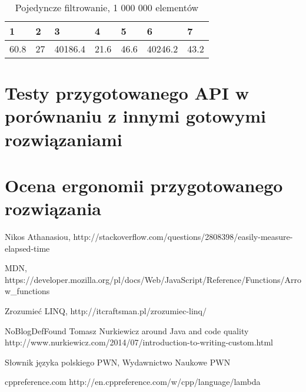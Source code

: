 \documentclass[a4paper,10pt]{report}
\begin{document}
\begin{table}[t]
	\caption{Pojedyncze filtrowanie, 1 000 000 elementów}
	\label{tab2}
	\begin{tabular}{|l|l|l|l|l|l|l|}
		\hline 
		1 & 2 & 3 & 4 & 5 & 6 & 7\\
		\hline
		60.8 & 27 & 40186.4 & 21.6 & 46.6 & 40246.2 & 43.2\\
		\hline
	\end{tabular} 
\end{table}

\section{Testy przygotowanego API w porównaniu z innymi gotowymi rozwiązaniami}
\section{Ocena ergonomii przygotowanego rozwiązania}
\begin{thebibliography}{9}
	
	Nikos Athanasiou,
	http://stackoverflow.com/questions/2808398/easily-measure-elapsed-time
	
	MDN,
	https://developer.mozilla.org/pl/docs/Web/JavaScript/Reference/Functions/Arrow\_functions
	
	Zrozumieć LINQ,
	http://itcraftsman.pl/zrozumiec-linq/

	NoBlogDefFound Tomasz Nurkiewicz around Java and code quality
	http://www.nurkiewicz.com/2014/07/introduction-to-writing-custom.html

	Słownik języka polskiego PWN,
	Wydawnictwo Naukowe PWN
	
	cppreference.com
	http://en.cppreference.com/w/cpp/language/lambda
	
\end{thebibliography}
\end{document}
